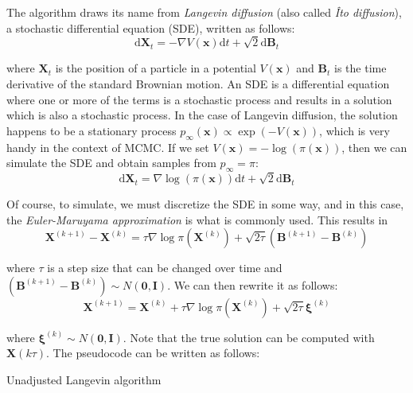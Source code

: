 \documentclass[12pt]{memoir}
\newcommand{\mb}{\mathbf}
\newcommand{\ti}{\textit}
\begin{document}
The algorithm draws its name from \ti{Langevin diffusion} (also called \ti{Îto diffusion}), a stochastic differential equation (SDE), written as follows:
\begin{equation}
    \mathrm{d}\mb X_t = -\nabla V(\mb x)\mathrm{d}t + \sqrt{2}\mathrm{d}\mb B_t
\end{equation}

where $\mb X_t$ is the position of a particle in a potential $V(\mb x)$ and $\mb B_t$ is the time derivative of the standard Brownian motion. An SDE is a differential equation where one or more of the terms is a stochastic process and results in a solution which is also a stochastic process. In the case of Langevin diffusion, the solution happens to be a stationary process $p_{\infty}(\mb x) \propto \exp(-V(\mb x))$, which is very handy in the context of MCMC. If we set $V(\mb x) = -\log(\pi(\mb x))$, then we can simulate the SDE and obtain samples from $p_\infty = \pi$:
\begin{equation}    
    \mathrm{d}\mb X_t = \nabla \log(\pi(\mb x))\mathrm{d}t + \sqrt{2}\mathrm{d}\mb B_t
\end{equation}


Of course, to simulate, we must discretize the SDE in some way, and in this case, the \textit{Euler-Maruyama approximation} is what is commonly used. This results in
\begin{equation}
    \mb X^{(k+1)} - \mb X^{(k)} = \tau \nabla \log\pi(\mb X^{(k)}) + \sqrt{2\tau}(\mb B^{(k+1)} - \mb B^{(k)})
\end{equation}

where $\tau$ is a step size that can be changed over time and $(\mb B^{(k+1)} - \mb B^{(k)}) \sim N(\mb 0, \mb I)$. We can then rewrite it as follows:
\begin{equation}
    \mb X^{(k+1)} = \mb X^{(k)} + \tau \nabla \log\pi(\mb X^{(k)}) + \sqrt{2\tau}\boldsymbol{\xi}^{(k)}
\end{equation}

where $\boldsymbol{\xi}^{(k)} \sim N(\mb 0, \mb I)$. Note that the true solution can be computed with $\mb X(k\tau)$. The pseudocode can be written as follows:\medbreak

\begin{algorithm}[H]

    \DontPrintSemicolon




    \Input{$\mb x^{(0)}, K, \tau^{(1)}, \dots, \tau^{(K)}$}

    \Output{$\mb x^{(1)}, \mb x^{(2)}, \dots, \mb x^{(K)}$}

    \For{$k\gets 1:K$}{

        $\boldsymbol{\xi}^{(k)} \sim N(\mb 0, \mb I)$\;

        $\mb x^{(k+1)} = \mb x^{(k)} + \tau^{(k)} \nabla \log\pi(\mb x^{(k)}) + \sqrt{2\tau^{(k)}}\boldsymbol{\xi}^{(k)}$\;

    }

    \caption{Unadjusted Langevin algorithm}

\end{algorithm}
\end{document}
